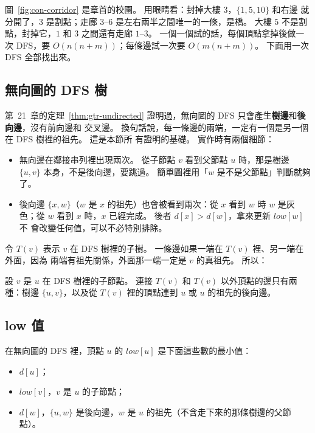 圖~\ref{fig:con-corridor} 是章首的校園。 用眼睛看：封掉大樓 $3$，$\{1, 5, 10\}$ 和右邊
就分開了，$3$ 是割點；走廊 $3$--$6$ 是左右兩半之間唯一的一條，是橋。 大樓 $5$ 不是割
點，封掉它，$1$ 和 $3$ 之間還有走廊 $1$--$3$。 一個一個試的話，每個頂點拿掉後做一次
DFS，要 $O(n(n + m))$；每條邊試一次要 $O(m(n + m))$。 下面用一次 DFS 全部找出來。

\subsection{無向圖的 DFS 樹}

第~21~章的定理~\ref{thm:gtr-undirected} 證明過，無向圖的 DFS 只會產生\textbf{樹邊}和\textbf{後向邊}，沒有前向邊和
交叉邊。 換句話說，每一條邊的兩端，一定有一個是另一個在 DFS 樹裡的祖先。 這是本節所
有證明的基礎。 實作時有兩個細節：

\begin{itemize}
\item 無向邊在鄰接串列裡出現兩次。 從子節點 $v$ 看到父節點 $u$ 時，那是樹邊 $\{u, v\}$
本身，不是後向邊，要跳過。 簡單圖裡用「$w$ 是不是父節點」判斷就夠了。
\item 後向邊 $\{x, w\}$（$w$ 是 $x$ 的祖先）也會被看到兩次：從 $x$ 看到 $w$ 時 $w$ 是灰
色；從 $w$ 看到 $x$ 時，$x$ 已經完成。 後者 $d[x] > d[w]$，拿來更新 $\mathit{low}[w]$ 不
會改變任何值，可以不必特別排除。
\end{itemize}

令 $T(v)$ 表示 $v$ 在 DFS 樹裡的子樹。 一條邊如果一端在 $T(v)$ 裡、另一端在外面，因為
兩端有祖先關係，外面那一端一定是 $v$ 的真祖先。 所以：

\begin{lemma}
\label{lem:con-leave}
設 $v$ 是 $u$ 在 DFS 樹裡的子節點。 連接 $T(v)$ 和 $T(v)$ 以外頂點的邊只有兩種：樹邊
$\{u, v\}$，以及從 $T(v)$ 裡的頂點連到 $u$ 或 $u$ 的祖先的後向邊。
\end{lemma}

\subsection{low 值}

\begin{definition}
在無向圖的 DFS 裡，頂點 $u$ 的 $\mathit{low}[u]$ 是下面這些數的最小值：
\begin{itemize}
\item $d[u]$；
\item $\mathit{low}[v]$，$v$ 是 $u$ 的子節點；
\item $d[w]$，$\{u, w\}$ 是後向邊，$w$ 是 $u$ 的祖先（不含走下來的那條樹邊的父節點）。
\end{itemize}
\end{definition}

